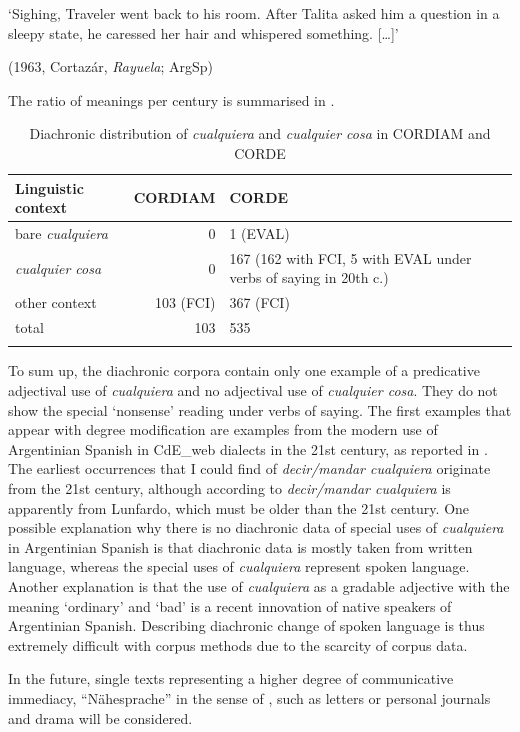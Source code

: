     \glt ‘Sighing, Traveler went back to his room. After Talita asked him a question in a sleepy state, he caressed her hair and whispered something. […]’

    (1963, Cortazár, \textit{Rayuela}; ArgSp)
\z
\z

{The ratio of meanings per century is summarised in }.

\begin{table}
\begin{tabularx}{\textwidth}{ lrQ@{} }
\lsptoprule
 Linguistic context & CORDIAM & CORDE \\ 
 \midrule
 bare \textit{cualquiera} & 0 & 1 (EVAL) \\
 \textit{cualquier cosa} & 0 & 167 (162 with FCI, 5 with EVAL under verbs of saying in 20th c.) \\
 other context & 103 (FCI) & 367 (FCI) \\
 \midrule
 total & 103 & 535\\
 \lspbottomrule
\end{tabularx}
\caption{\label{tab:4:extra} Diachronic distribution of \textit{cualquiera} and \textit{cualquier cosa} in CORDIAM and CORDE}
\end{table}

To sum up, the diachronic corpora contain only one example of a predicative adjectival use of \textit{cualquiera} and no adjectival use of \textit{cualquier cosa}. They do not show the special ‘nonsense’ reading under verbs of saying. The first examples that appear with degree modification are examples from the modern use of Argentinian Spanish in CdE\_web dialects in the 21st century, as reported in . The earliest occurrences that I could find of \textit{decir/mandar cualquiera} originate from the 21st century, although according to \citet{Conde2011} \textit{decir/mandar cualquiera} is apparently from Lunfardo, which must be older than the 21st century. One possible explanation why there is no diachronic data of special uses of \textit{cualquiera} in Argentinian Spanish is that diachronic data is mostly taken from written language, whereas the special uses of \textit{cualquiera} represent spoken language. Another explanation is that the use of \textit{cualquiera} as a gradable adjective with the meaning ‘ordinary’ and ‘bad’ is a recent innovation of native speakers of Argentinian Spanish. Describing diachronic change of spoken language is thus extremely difficult with corpus methods due to the scarcity of corpus data. 

{In the future, single texts representing a higher degree of communicative immediacy, ``Nähesprache'' in the sense of \citet{koch1990gesprochene}, such as letters or personal journals and drama will be considered.}

